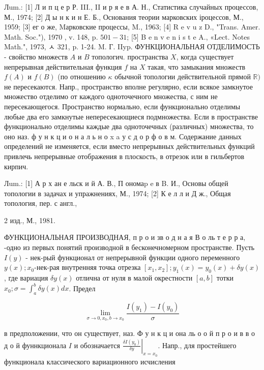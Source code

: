 \documentclass[10pt]{article}
\begin{document}
Лum.: [1] Л и п ц е р Р. III., II и р я е в А. Н., Статистика случайных процессов, М., 1974; [2] Д ы н к и н Е. Б., Основания теории марковских іроцессов, М., 1959; [3] ег о же, Mарковские процессы, M., 1963; [4] R e v u z D., "Trans. Amer. Math. Soc."), 1970 , v. 148, p. $501-31$; [5] B e n v e n i s t e A., «Lect. Notes Math.", 1973, ㅅ 321, p. 1-24. M. Г. IIyp. ФУНКЦИОНАЛЬНАЯ ОТДЕЛИМОСТЬ - свойство множеств $A$ и $B$ топологич. пространства $X$, когда существует непрерывная действительная функция $f$ на $X$ такая, что замыкания множеств $f(A)$ и $f(B)$ (по отношению $\kappa$ обычной топологии действительной прямой $\mathbb{R})$ не пересекаются. Напр., пространство вполне регулярно, если всякое замкнутое множество отделимо от каждого одноточечного множества, с ним не пересекающегося. Пространство нормально, если функционально отделимы любые два его замкнутые непересекающиеся подмножества. Если в пространстве функционально отделимы каждые два одноточечных (различных) множества, то оно наз. ф у н к ц и о н а л ь н о x a у с д о р ф о в м. Содержание данных определений не изменяется, если вместо непрерывных действительных функций привлечь непрерывные отображения в плоскость, в отрезок или в гильбертов кирпич.



Лum.: [1] А р х ан е льск и й А. В., П ономаp e в B. И., Основы общей топологии в задачах и упражнениях, М., 1974; [2] К е л л и Д ж., Общая топология, пер. с англ.,

2 изд., М., 1981.



ФУНКЦИОНАЛЬНАЯ ПРОИЗВОДНАЯ, п р о и зв о д н а я В о ль т е р р а, -одно из первых понятий производной в бесконечномерном пространстве. Пусть $I(y)$ - нек-рый функционал от непрерывной функции одного переменного $y(x) ; x_{0}$-нек-рая внутренняя точка отрезка $\left[x_{1}, x_{2}\right] ; y_{1}(x)=y_{0}(x)+\delta y(x)$, где вариация $\delta y(x)$ отлична от нуля в малой окрестности $[a, b]$ тотки $x_{0} ; \sigma=\int_{a}^{b} \delta y(x) d x$. Предел



\[

\lim _{\sigma \rightarrow 0, x_{0}, b \rightarrow x_{0}} \frac{I\left(y_{1}\right)-I\left(y_{0}\right)}{\sigma}

\]



в предположении, что он существует, наз. Ф у н к ц и она ль о о й п р о и в в о д о й фуннкционала $I$ и обозначается $\left.\frac{\delta I\left(y_{0}\right)}{\delta y}\right|_{x=x_{0}}$. Напр., для простейшего функционала классического вариационного исчисления
\end{document}
